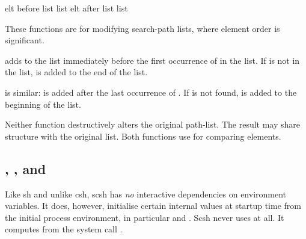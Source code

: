 %
%

 {elt before list} {list}
  {elt after list}  {list}
\begin{desc}
    These functions are for modifying search-path lists, where element order
    is significant.

     adds  to the list immediately
    before the first occurrence of  in the list.
    If  is not in the list,  is added to the end
    of the list.

     is similar:
     is added after the last occurrence of .
    If  is not found, 
     is added to the beginning of the list.

    Neither function destructively alters the original path-list.
    The result may share structure with the original list.
    Both functions use  for comparing elements.
\end{desc}

    
\subsection{, , and }

Like sh and unlike csh, scsh has \emph{no} interactive dependencies on
environment variables.
It does, however, initialise certain internal values at startup time from the
initial process environment, in particular  and .
Scsh never uses  at all.
It computes  from the system call .

